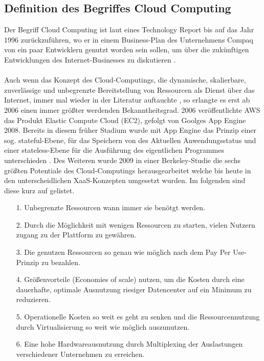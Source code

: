 \documentclass[11pt]{article}
\begin{document}
\subsection{Definition des Begriffes Cloud Computing}
Der Begriff Cloud Computing ist laut eines Technology Report bis auf das Jahr 1996 zurückzuführen, wo er in einem Business-Plan des Unternehmens Compaq von ein paar Entwicklern genutzt worden sein sollen, um über die zukünftigen Entwicklungen des Internet-Businesses zu diskutieren \cite{regalado2011coined}. \\\\
Auch wenn das Konzept des Cloud-Computings, die dynamische, skalierbare, zuverlässige und unbegrenzte Bereitstellung von Ressourcen als Dienst über das Internet, immer mal wieder in der Literatur auftauchte \cite{fox2009above}, so erlangte es erst ab 2006 einen immer größter werdenden Bekanntheitsgrad. 2006 veröffentlichte AWS das Produkt Elastic Compute Cloud (EC2), gefolgt von Goolges App Engine 2008. Bereits in diesem früher Stadium wurde mit App Engine das Prinzip einer sog. \glqq stateful\grqq{}-Ebene, für das Speichern von des Aktuellen Anwendungsstatus und einer \glqq stateless\grqq{}-Ebene für die Ausführung des eigentlichen Programmes unterschieden \cite{fox2009above}. Des Weiteren wurde 2009 in einer Berkeley-Studie die sechs größten Potentiale des Cloud-Computings herausgearbeitet welche bis heute in den unterscheidlichen XaaS-Konzepten umgesetzt wurden. Im folgenden sind diese kurz auf gelistet. \\
\begin{itemize}
\item[1.] Unbegrenzte Ressourcen wann immer sie benötgt werden. 
\item[2.] Durch die Möglichkeit mit wenigen Ressourcen zu starten, vielen Nutzern zugang zu der Plattform zu gewähren. 
\item[3.] Die genutzen Ressourcen so genau wie möglich nach dem \glqq Pay Per Use\grqq{}-Prinzip zu bezahlen. 
\item[4.] Größenvorteile (Economies of scale) nutzen, um die Kosten durch eine dauerhafte, optimale Ausnutzung riesiger Datencenter auf ein Minimum zu reduzieren. 
\item[5.] Operationelle Kosten so weit es geht zu senken und die Ressourcennutzung durch Virtualisierung so weit wie möglich auszunutzen. 
\item[6.] Eine hohe Hardwareausnutzung durch \glqq Multiplexing\grqq{} der Auslastungen verschiedener Unternehmen zu erreichen.
\end{itemize}
\end{document}
